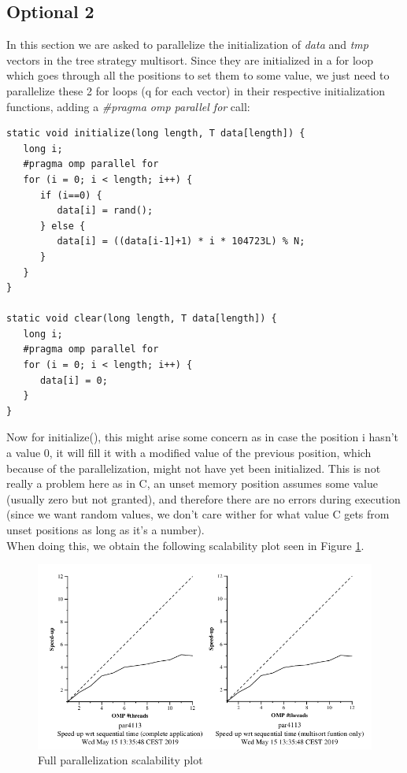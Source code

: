 \documentclass[12]{article}
\begin{document}
\subsection{Optional 2}
In this section we are asked to parallelize the initialization of \textit{data} and \textit{tmp} vectors in the tree strategy multisort. Since they are initialized in a for loop which goes through all the positions to set them to some value, we just need to parallelize these 2 for loops (q for each vector) in their respective initialization functions, adding a \textit{#pragma omp parallel for} call:
\begin{lstlisting}[frame=single]
static void initialize(long length, T data[length]) {
   long i;
   #pragma omp parallel for
   for (i = 0; i < length; i++) {
      if (i==0) {
         data[i] = rand();
      } else {
         data[i] = ((data[i-1]+1) * i * 104723L) % N;
      }   
   }   
}

static void clear(long length, T data[length]) {
   long i;
   #pragma omp parallel for
   for (i = 0; i < length; i++) {
      data[i] = 0;
   }   
}
\end{lstlisting}
Now for initialize(), this might arise some concern as in case the position i hasn't a value 0, it will fill it with a modified value of the previous position, which because of the parallelization, might not have yet been initialized. This is not really a problem here as in C, an unset memory position assumes some value (usually zero but not granted), and therefore there are no errors during execution (since we want random values, we don't care wither for what value C gets from unset positions as long as it's a number).
\\
When doing this, we obtain the following scalability plot seen in Figure \ref{fullParStrong}.
\\
\medskip
\begin{figure}[H]
    \centering
    \includegraphics[scale=0.75]{images/fullParStrong.png}
    \caption{Full parallelization scalability plot}
    \label{fullParStrong}
\end{figure}
\end{document}
